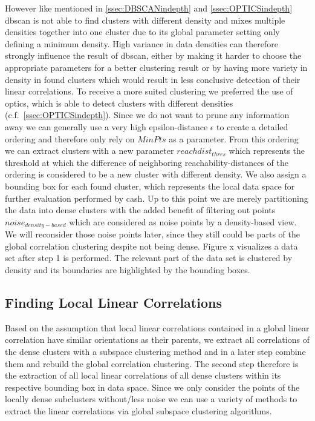 However like mentioned in \autoref{ssec:DBSCANindepth} and \autoref{ssec:OPTICSindepth} \gls{dbscan} is not able to find clusters with different density and mixes multiple densities together into one cluster due to its global parameter setting only defining a minimum density. High variance in data densities can therefore strongly influence the result of \gls{dbscan}, either by making it harder to choose the appropriate parameters for a better clustering result or by having more variety in density in found clusters which would result in less conclusive detection of their linear correlations. 
To receive a more suited clustering we preferred the use of \gls{optics}, which is able to detect clusters with different densities (c.f.~\autoref{ssec:OPTICSindepth}). Since we do not want to prune any information away we can generally use a very high epsilon-distance $\epsilon$ to create a detailed ordering and therefore only rely on $MinPts$ as a parameter. From this ordering we can extract clusters with a new parameter $reachdist_{thres}$ which represents the threshold at which the difference of neighboring reachability-distances of the ordering is considered to be a new cluster with different density. We also assign a bounding box for each found cluster, which represents the local data space for further evaluation performed by \gls{cash}. Up to this point we are merely partitioning the data into dense clusters with the added benefit of filtering out points $noise_{density-based}$ which are considered as noise points by a density-based view. We will reconsider those noise points later, since they still could be parts of the global correlation clustering despite not being dense. Figure x visualizes a data set after step 1 is performed. The relevant part of the data set is clustered by density and its boundaries are highlighted by the bounding boxes.

\subsection{Finding Local Linear Correlations}
Based on the assumption that local linear correlations contained in a global linear correlation have similar orientations as their parents, we extract all correlations of the dense clusters with a subspace clustering method and in a later step combine them and rebuild the global correlation clustering. The second step therefore is the extraction of all local linear correlations of all dense clusters within its respective bounding box in data space. Since we only consider the points of the locally dense subclusters without/less noise we can use a variety of methods to extract the linear correlations via global subspace clustering algorithms. 

